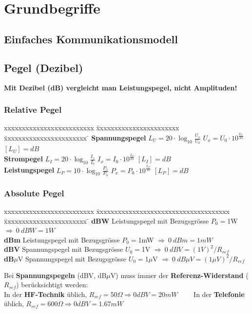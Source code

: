 \section{Grundbegriffe}
\subsection{Einfaches Kommunikationsmodell}
\begin{center}
	
\end{center}

\subsection{Pegel (Dezibel)}
\textbf{Mit Dezibel (dB) vergleicht man Leistungspegel, nicht Amplituden!}

\subsubsection{Relative Pegel}
	\begin{tabbing}
	xxxxxxxxxxxxxxxxxxxxxxxxx \= xxxxxxxxxxxxxxxxxxxxxxx  \= xxxxxxxxxxxxxxxxxxxxxxx \=\kill
	\textbf{Spannungspegel} \> $L_U = 20 \cdot \log_{10} \frac{U_x}{U_0}$ \> $U_x = U_0 \cdot
	10^{\frac{L_U}{20}} $ \> $[L_U] = dB$ \\ 
	\textbf{Strompegel} \> $L_I  = 20 \cdot \log_{10} \frac{I_x}{I_0}$ \> $I_x = I_0 \cdot
	10^{\frac{L_I}{20}} $ \> $[L_I] = dB$ \\ 
	\textbf{Leistungspegel} \> $L_P = 10 \cdot \log_{10} \frac{P_x}{P_0}$ \> $P_x = P_0 \cdot
	10^{\frac{L_U}{10}} $ \> $[L_P] = dB$
	\end{tabbing}

\subsubsection{Absolute Pegel}
	\begin{tabbing}
	xxxxxxxxxxxxxxxxxxxxxxxxx \= xxxxxxxxxxxxxxxxxxxxxxxxxxxxxxxxxxxxx  \= xxxxxxxxxxxxxxxxxxxxxxx \=\kill
	\textbf{dBW} \> Leistungspegel mit Bezugsgrösse $P_0 = $1W \> $\Longrightarrow \: 0 \: dBW = 1W$\\
	\textbf{dBm} \> Leistungspegel mit Bezugsgrösse $P_0 = $1mW \> $\Longrightarrow \: 0 \: dBm = 1mW$\\
	\textbf{dBV} \> Spannungspegel mit Bezugsgrösse $U_0 = $1V \> $\Longrightarrow \: 0 \: dBV = (1V)^2/R_{ref}$\\
	\textbf{dB}$\mu$V \> Spannungspegel mit Bezugsgrösse $U_0 = $1$\mu$V \> $\Longrightarrow \: 0 \: dB \mu V = (1 \mu V)^2/R_{ref}$
	\end{tabbing}
Bei \textbf{Spannungspegeln} (dBV, dB$\mu$V) muss immer der \textbf{Referenz-Widerstand} ($R_{ref}$) berücksichtigt werden: \\
In der \textbf{HF-Technik} üblich, $R_{ref} = 50 \Omega \Rightarrow 0 dBV = 20 mW \qquad $
In der \textbf{Telefonie} üblich, $R_{ref} = 600  \Omega \Rightarrow 0 dBV =
1.67 mW$ 

